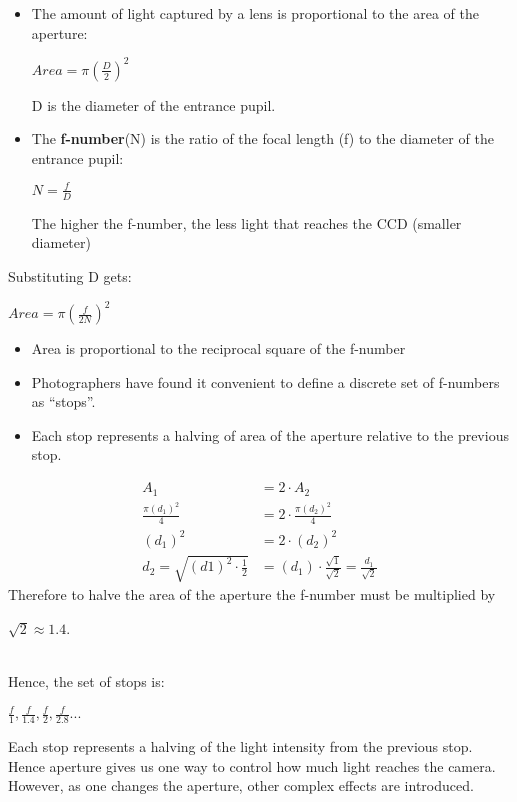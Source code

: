 \documentclass{article}\author{Hawley, Adam}
\begin{document}
\begin{itemize}
	\item {The amount of light captured by a lens is proportional to the area of the aperture:

\centerline{$Area = \pi(\frac{D}{2})^2$}

D is the diameter of the entrance pupil.}

\item {The {\bf f-number}(N) is the ratio of the focal length (f) to the diameter of the entrance pupil:

\centerline{$N = \frac{f}{D}$}

The higher the f-number, the less light that reaches the CCD (smaller diameter)}

\end{itemize}

Substituting D gets:

\centerline{$Area = \pi (\frac{f}{2N})^2$}

\begin{itemize}
	\item Area is proportional to the reciprocal square of the f-number
	\item Photographers have found it convenient to define a discrete set of f-numbers as ``stops''.
	\item Each stop represents a halving of area of the aperture relative to the previous stop.
\end{itemize}
\begin{align*}
	A_1 &= 2\cdot A_2 \\
	\frac{\pi(d_1)^2}{4} &= 2\cdot \frac{\pi(d_2)^2}{4} \\
	(d_1)^2 &= 2\cdot (d_2)^2 \\
d_2 = \sqrt{(d1)^2\cdot\frac{1}{2}} &= (d_1)\cdot \frac{\sqrt{1}}{\sqrt{2}} = \frac{d_1}{\sqrt{2}}
\end{align*}
Therefore to halve the area of the aperture the f-number must be multiplied by \\ 
\centerline{$\sqrt{2} \approx 1.4$.} \\
Hence, the set of stops is:\\
\centerline{$\frac{f}{1}, \frac{f}{1.4}, \frac{f}{2}, \frac{f}{2.8} ...$}

Each stop represents a halving of the light intensity from the previous stop. 
Hence aperture gives us one way to control how much light reaches the camera.
However, as one changes the aperture, other complex effects are introduced.
\end{document}
